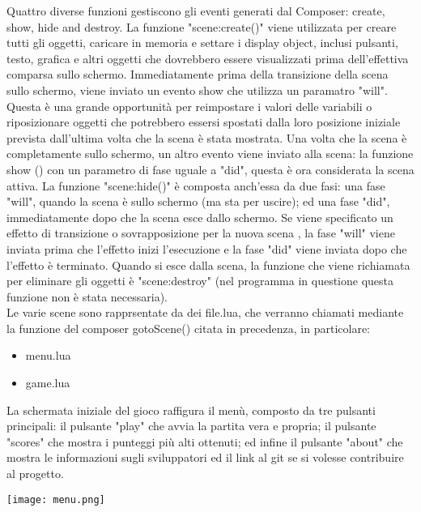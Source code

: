 \documentclass[12pt]{article}
\begin{document}
Quattro diverse funzioni gestiscono gli eventi generati dal Composer: create, show, hide and destroy.
La funzione "scene:create()" viene utilizzata per creare tutti gli oggetti, caricare in memoria e settare i display object, inclusi pulsanti, testo, grafica e altri oggetti che dovrebbero essere visualizzati prima dell'effettiva comparsa sullo schermo.
Immediatamente prima della transizione della scena sullo schermo, viene inviato un evento show che utilizza un paramatro "will". Questa è una grande opportunità per reimpostare i valori delle variabili o riposizionare oggetti che potrebbero essersi spostati dalla loro posizione iniziale prevista dall'ultima volta che la scena è stata mostrata. Una volta che la scena è completamente sullo schermo, un altro evento viene inviato alla scena: la funzione show () con un parametro di fase uguale a "did", questa è ora considerata la scena attiva.
La funzione "scene:hide()" è composta anch'essa da due fasi: una fase "will", quando la scena è sullo schermo (ma sta per uscire); ed una fase "did", immediatamente dopo che la scena esce dallo schermo. Se viene specificato un effetto di transizione o sovrapposizione per la nuova scena , la fase "will" viene inviata prima che l'effetto inizi l'esecuzione e la fase "did" viene inviata dopo che l'effetto è terminato.
Quando si esce dalla scena, la funzione che viene richiamata per eliminare gli oggetti è "scene:destroy" (nel programma in questione questa funzione non è stata necessaria). 
\\


Le varie scene sono rapprsentate da dei file.lua, che verranno chiamati mediante la funzione del composer gotoScene() citata in precedenza, in particolare:
\begin{itemize}
    \item menu.lua
    \item game.lua
\end{itemize}



La schermata iniziale del gioco raffigura il menù, composto da tre pulsanti principali: il pulsante "play" che avvia la partita vera e propria; il pulsante "scores" che mostra i punteggi più alti ottenuti; ed infine il pulsante "about" che mostra le informazioni sugli sviluppatori ed il link al git se si volesse contribuire al progetto. \\
\begin{center}
    \texttt{[image: menu.png]}\\
\end{center}
\end{document}
